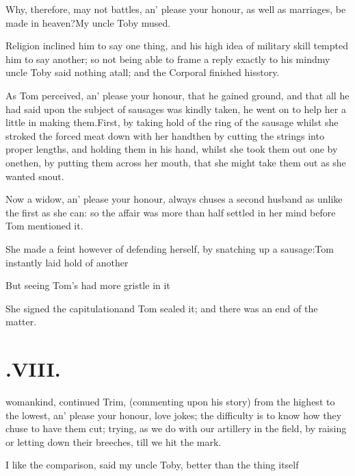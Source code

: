 \documentclass{article}
\begin{document}
\tsh Why, therefore, may not battles, an’ please
your honour, as well as marriages, be made in heaven?\tsk My
uncle Toby mused.\tsh

Religion inclined him to say one thing, and his high idea of
military skill tempted him to say another; so not being able to
frame a reply exactly to his mind\break\tsh my uncle Toby
said nothing at\break all; and the Corporal finished his\break story.

As Tom perceived, an’ please your honour, that he
gained ground, and that all he had said upon the subject of
sausages was kindly taken, he went on to help her a little in
making them.\tsh\break First, by taking hold of the ring of the
sausage whilst she stroked the forced meat down with her
hand\tsh then by cutting the strings into proper lengths,
and holding them in his hand, whilst she took them out one by
one\tsh then, by putting them across her mouth, that she might
take them out as she wanted\break
{}
snout.\tsh\etp

\tsh Now a widow, an’ please your honour, always chuses a second husband as
unlike the first as she can: so the affair was more than half settled in her mind
before Tom mentioned it.

She made a feint however of defending herself, by snatching up a
sausage:\break\tsh Tom instantly laid hold of
another\tsh

But seeing Tom’s had more gristle in
it\tsh

She signed the capitulation\tsh and Tom sealed
it; and there was an end of the matter.

\vfill{}\eject
\null{}\baselineskip
\section{.\enspace VIII.}

 womankind, continued Trim,
(commenting upon his story) from the highest to the lowest, an’ please your honour,
love jokes; the difficulty is to know how they chuse to have them cut; 
trying, as we do with our artillery in the field, by raising or letting down their
breeches, till we hit the mark.\tsh

\tsh I like the comparison, said my uncle Toby,
better than the thing it\-self\tsh
\end{document}

